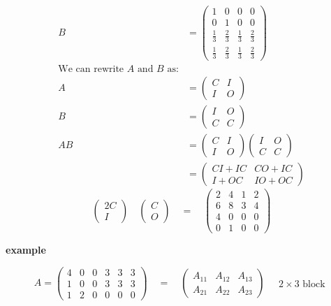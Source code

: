 \documentclass[a4paper, 12pt]{article}
\begin{document}
\begin{align*}
B &= \begin{pmatrix}
1 & 0 & 0 & 0 \\
0 & 1 & 0 & 0 \\
\frac{1}{3} & \frac{2}{3} & \frac{1}{3} & \frac{2}{3} \\
\frac{1}{3} & \frac{2}{3} & \frac{1}{3} & \frac{2}{3}
\end{pmatrix} \\[10pt]
\text{We can rewrite } A \text{ and } B \text{ as:} \\[10pt]
A &= \begin{pmatrix}
C & I \\
I & O
\end{pmatrix} \\[10pt]
B &= \begin{pmatrix}
I & O \\
C & C
\end{pmatrix} \\[10pt]
AB &= \begin{pmatrix}
C & I \\
I & O
\end{pmatrix}
\begin{pmatrix}
I & O \\
C & C
\end{pmatrix} \\[10pt]
&= \begin{pmatrix}
CI + IC & CO + IC \\
I + OC & IO + OC
\end{pmatrix}
\end{align*}\begin{equation*}
\begin{pmatrix}
2C \\
I
\end{pmatrix}
\quad
\begin{pmatrix}
C \\
O
\end{pmatrix}
\quad = \quad
\begin{pmatrix}
2 & 4 & 1 & 2 \\
6 & 8 & 3 & 4 \\
4 & 0 & 0 & 0 \\
0 & 1 & 0 & 0
\end{pmatrix}
\end{equation*}

\textbf{example}

\begin{equation*}
A = 
\begin{pmatrix}
4 & 0 & 0 & 3 & 3 & 3 \\
1 & 0 & 0 & 3 & 3 & 3 \\
1 & 2 & 0 & 0 & 0 & 0
\end{pmatrix}
\quad = \quad
\begin{pmatrix}
A_{11} & A_{12} & A_{13} \\
A_{21} & A_{22} & A_{23}
\end{pmatrix}
\quad
\begin{matrix}
2 \times 3 \text{ block}
\end{matrix}
\end{equation*}
\end{document}
